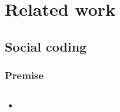 \documentclass{beamer}
\begin{document}
\section{Related work}

\subsection{Social coding}

\begin{frame}
  \frametitle{Premise}

  \begin{columns}[T]
    \begin{column}{.5\textwidth}
      \begin{itemize}

      \item
        

      \end{itemize}


\end{column}
\end{columns}
\end{frame}
\end{document}
